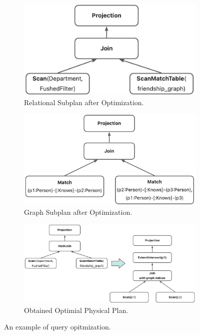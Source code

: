 \begin{figure}
\begin{subfigure}[b]{0.4\linewidth}
    \end{subfigure}
    \begin{subfigure}[b]{0.4\linewidth}
        \centering
        \includegraphics[width=\linewidth]{./figures/converged-logical-plan-relational-optimized.png}
        \caption{Relational Subplan after Optimization.}
        \label{fig:relational-plan-optimized}
    \end{subfigure}
    \begin{subfigure}[b]{0.4\linewidth}
        \centering
        \includegraphics[width=\linewidth]{./figures/converged-logical-plan-graph-optimized.png}
        \caption{Graph Subplan after Optimization.}
        \label{fig:graph-plan-optimized}
    \end{subfigure}
    \begin{subfigure}[b]{0.4\linewidth}
        \centering
        \includegraphics[width=\linewidth]{./figures/converged-physical-plan.png}
        \caption{Obtained Optimial Physical Plan.}
        \label{fig:physical-plan-optimized}
    \end{subfigure}
    \caption{An example of query opitmization.}
    \label{fig:query-grtree-example}
\end{figure}


